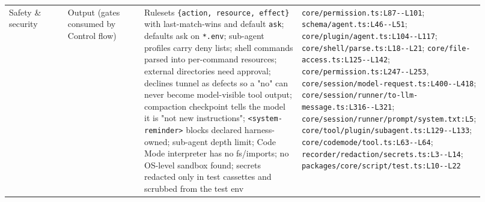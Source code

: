 \begin{longtable}{@{}p{0.13\linewidth}p{0.17\linewidth}p{0.36\linewidth}p{0.26\linewidth}@{}}
Safety \& security & Output (gates consumed by Control flow) & Rulesets \texttt{\{action, resource, effect\}} with last-match-wins and default \texttt{ask}; defaults ask on \texttt{*.\allowbreak{}env}; sub-agent profiles carry deny lists; shell commands parsed into per-command resources; external directories need approval; declines tunnel as defects so a "no" can never become model-visible tool output; compaction checkpoint tells the model it is "not new instructions"; \texttt{<system-\allowbreak{}reminder>} blocks declared harness-owned; sub-agent depth limit; Code Mode interpreter has no fs/imports; no OS-level sandbox found; secrets redacted only in test cassettes and scrubbed from the test env & \texttt{core/\allowbreak{}permission.\allowbreak{}ts:\allowbreak{}L87-\allowbreak{}-\allowbreak{}L101}; \texttt{schema/\allowbreak{}agent.\allowbreak{}ts:\allowbreak{}L46-\allowbreak{}-\allowbreak{}L51}; \texttt{core/\allowbreak{}plugin/\allowbreak{}agent.\allowbreak{}ts:\allowbreak{}L104-\allowbreak{}-\allowbreak{}L117}; \texttt{core/\allowbreak{}shell/\allowbreak{}parse.\allowbreak{}ts:\allowbreak{}L18-\allowbreak{}-\allowbreak{}L21}; \texttt{core/\allowbreak{}file-\allowbreak{}access.\allowbreak{}ts:\allowbreak{}L125-\allowbreak{}-\allowbreak{}L142}; \texttt{core/\allowbreak{}permission.\allowbreak{}ts:\allowbreak{}L247-\allowbreak{}-\allowbreak{}L253}, \texttt{core/\allowbreak{}session/\allowbreak{}model-\allowbreak{}request.\allowbreak{}ts:\allowbreak{}L400-\allowbreak{}-\allowbreak{}L418}; \texttt{core/\allowbreak{}session/\allowbreak{}runner/\allowbreak{}to-\allowbreak{}llm-\allowbreak{}message.\allowbreak{}ts:\allowbreak{}L316-\allowbreak{}-\allowbreak{}L321}; \texttt{core/\allowbreak{}session/\allowbreak{}runner/\allowbreak{}prompt/\allowbreak{}system.\allowbreak{}txt:\allowbreak{}L5}; \texttt{core/\allowbreak{}tool/\allowbreak{}plugin/\allowbreak{}subagent.\allowbreak{}ts:\allowbreak{}L129-\allowbreak{}-\allowbreak{}L133}; \texttt{core/\allowbreak{}codemode/\allowbreak{}tool.\allowbreak{}ts:\allowbreak{}L63-\allowbreak{}-\allowbreak{}L64}; \texttt{recorder/\allowbreak{}redaction/\allowbreak{}secrets.\allowbreak{}ts:\allowbreak{}L3-\allowbreak{}-\allowbreak{}L14}; \texttt{packages/\allowbreak{}core/\allowbreak{}script/\allowbreak{}test.\allowbreak{}ts:\allowbreak{}L10-\allowbreak{}-\allowbreak{}L22} \\

\end{longtable}
